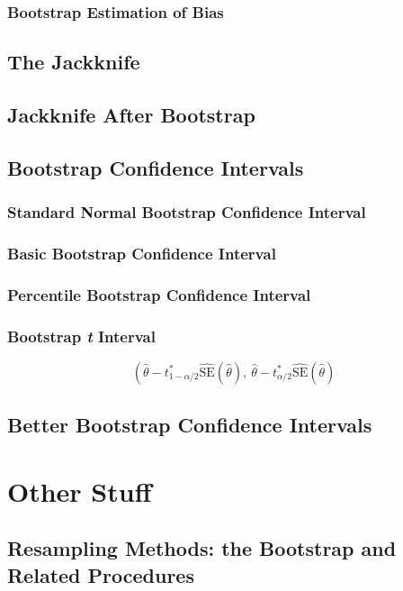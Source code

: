 \documentclass[captions=tableheading]{scrbook}
\begin{document}
 
\subsection{Bootstrap Estimation of Bias}
\label{sec-4_2_2}
\section{The Jackknife}
\label{sec-4_3}
\section{Jackknife After Bootstrap}
\label{sec-4_4}
\section{Bootstrap Confidence Intervals}
\label{sec-4_5}
\subsection{Standard Normal Bootstrap Confidence Interval}
\label{sec-4_5_1}
\subsection{Basic Bootstrap Confidence Interval}
\label{sec-4_5_2}
\subsection{Percentile Bootstrap Confidence Interval}
\label{sec-4_5_3}
\subsection{Bootstrap \emph{t} Interval}
\label{sec-4_5_4}

\[
\left( \hat{\theta} - t_{1 - \alpha/2}^{\ast}\widehat{\mathrm{SE}}(\hat{\theta}),\  \hat{\theta} - t_{\alpha/2}^{\ast}\widehat{\mathrm{SE}}(\hat{\theta})
\]
\section{Better Bootstrap Confidence Intervals}
\label{sec-4_6}
\chapter{Other Stuff}
\label{sec-5}
\section{Resampling Methods: the Bootstrap and Related Procedures}
\label{sec-5_1}
\end{document}
